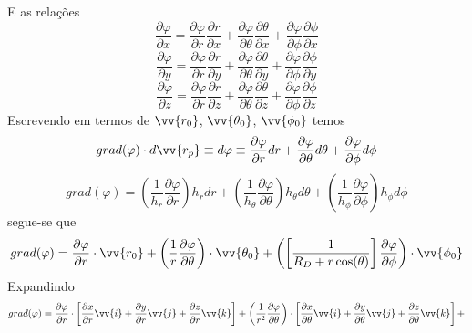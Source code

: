 \documentclass[12pt,oneside,a4paper]{abntex2}
\begin{document}
E as relações
\begin{equation}
\dfrac{\partial \varphi}{\partial x} = \dfrac{\partial \varphi}{\partial r} \dfrac{\partial r}{\partial x} + \dfrac{\partial \varphi}{\partial \theta} \dfrac{\partial \theta}{\partial x} + \dfrac{\partial \varphi}{\partial \phi} \dfrac{\partial \phi}{\partial x}
\end{equation}
\begin{equation}
\dfrac{\partial \varphi}{\partial y} = \dfrac{\partial \varphi}{\partial r} \dfrac{\partial r}{\partial y} + \dfrac{\partial \varphi}{\partial \theta} \dfrac{\partial \theta}{\partial y} + \dfrac{\partial \varphi}{\partial \phi} \dfrac{\partial \phi}{\partial y}
\end{equation}
\begin{equation}
\dfrac{\partial \varphi}{\partial z} = \dfrac{\partial \varphi}{\partial r} \dfrac{\partial r}{\partial z} + \dfrac{\partial \varphi}{\partial \theta} \dfrac{\partial \theta}{\partial z} + \dfrac{\partial \varphi}{\partial \phi} \dfrac{\partial \phi}{\partial z}
\end{equation}
Escrevendo em termos de $\vv{r_0}$, $\vv{\theta_0}$, $\vv{\phi_0}$ temos
\begin{equation}
grad (\varphi) \cdot d\vv{r_p} \equiv d\varphi \equiv \dfrac{\partial \varphi}{\partial r} dr + \dfrac{\partial \varphi}{\partial \theta} d\theta + \dfrac{\partial \varphi}{\partial \phi} d\phi
\end{equation}
\begin{equation}
grad(\varphi) = \left(\frac{1}{h_r}\dfrac{\partial \varphi}{\partial r} \right) h_r dr + \left(\frac{1}{h_\theta}\dfrac{\partial \varphi}{\partial \theta} \right) h_\theta d\theta + \left(\frac{1}{h_\phi}\dfrac{\partial \varphi}{\partial \phi} \right) h_\phi d\phi
\end{equation}
segue-se que
\begin{equation}
grad(\varphi) = \dfrac{\partial \varphi}{\partial r} \cdot \vv{r_0} + \left(\frac{1}{r}\dfrac{\partial \varphi}{\partial \theta} \right) \cdot \vv{\theta_0} + \left( \left[ \frac{1}{ R_D + r \cos(\theta)}\right] \dfrac{\partial \varphi}{\partial \phi}\right) \cdot \vv{\phi_0}
\end{equation}
Expandindo
\begin{equation}
grad(\varphi) = \dfrac{\partial \varphi}{\partial r} \cdot \left[ \dfrac{\partial x}{\partial r}\vv{i} + \dfrac{\partial y}{\partial r}\vv{j} + \dfrac{\partial z}{\partial r}\vv{k}\right] + \left(\frac{1}{r^2}\dfrac{\partial \varphi}{\partial \theta} \right) \cdot \left[\dfrac{\partial x}{\partial \theta}\vv{i} + \dfrac{\partial y}{\partial \theta}\vv{j} + \dfrac{\partial z}{\partial \theta}\vv{k}  \right] + 
\end{equation}
\end{document}

